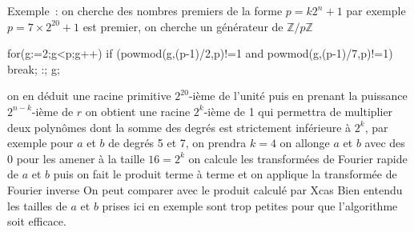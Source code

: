 \documentclass[a4paper,11pt]{article}
\begin{document}
\begin{giacjshere}
Exemple~: on cherche des nombres premiers de la forme $p=k2^n+1$
par exemple $p=7\times 2^{20}+1$ est premier, 
on cherche un g\'en\'erateur de $\mathbb{Z}/p\mathbb{Z}$
\begin{giacprog}
for(g:=2;g<p;g++){ 
  if (powmod(g,(p-1)/2,p)!=1 and powmod(g,(p-1)/7,p)!=1) break;
}:; g;
\end{giacprog}
on en d\'eduit une racine primitive $2^{20}$-i\`eme de l'unit\'e
puis en prenant la puissance $2^{n-k}$-i\`eme de $r$ on obtient une
racine $2^k$-i\`eme de 1 qui permettra de multiplier deux
polyn\^omes dont la somme des degr\'es est strictement 
inf\'erieure \`a $2^k$, par exemple pour $a$ et $b$ de
degr\'es 5 et 7, on prendra $k=4$
on allonge $a$ et $b$ avec des 0 pour les amener \`a la taille $16=2^k$
on calcule les transform\'ees de Fourier rapide de $a$ et $b$
puis on fait le produit terme \`a terme et on applique la transform\'ee
de Fourier inverse
On peut comparer avec le produit calcul\'e par Xcas
Bien entendu les tailles de $a$ et $b$ prises ici
en exemple sont trop petites
pour que l'algorithme soit efficace.


\end{giacjshere}
\end{document}
